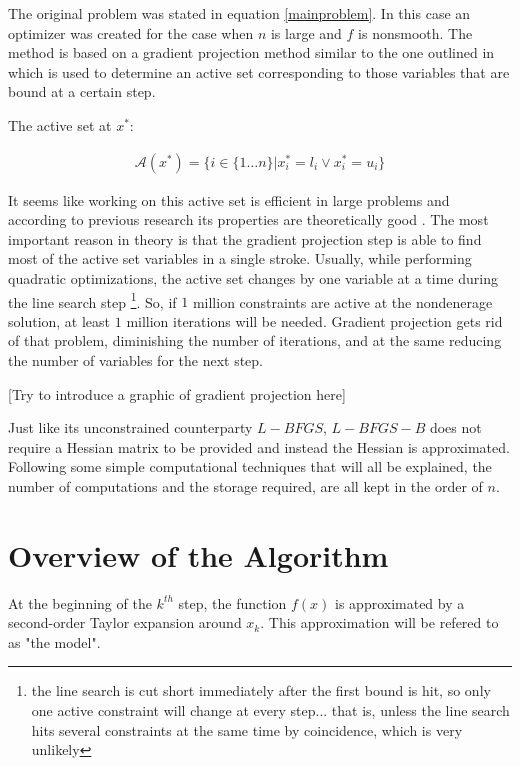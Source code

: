 The original problem was stated in equation \ref{mainproblem}.  In this case an optimizer was created for the case when $n$ is large and $f$ is nonsmooth.  The method is based on a gradient projection method similar to the one outlined in \citep{gradproj1, gradproj2} which is used to determine an active set corresponding to those variables that are bound at a certain step.  

The active set at $x^*$:

\begin{equation}
  \begin{aligned}
    \mathcal{A}(x^*) = \{ i \in \{1 \ldots n\} |  x^*_i = l_i \vee  x^*_i = u_i\}
  \end{aligned}
\end{equation}

It seems like working on this active set  is efficient in large problems and according to previous research its properties are theoretically good \citep{nocedal}.  The most important reason in theory is that the gradient projection step is able to find most of the active set variables in a single stroke.  Usually, while performing quadratic optimizations, the active set changes by one variable at a time during the line search step \footnote{the line search is cut short immediately after the first bound is hit, so only one active constraint will change at every step... that is, unless the line search hits several constraints at the same time by coincidence, which is very unlikely}.  So, if $1$ million constraints are active at the nondenerage solution, at least $1$ million iterations will be needed.   Gradient projection gets rid of that problem, diminishing the number of iterations, and at the same reducing the number of variables for the next step.

[Try to introduce a graphic of gradient projection here]

Just like its unconstrained counterparty $L-BFGS$, $L-BFGS-B$ does not require a Hessian matrix to be provided and instead the Hessian is approximated.  Following some simple computational techniques that will all be explained, the number of computations and the storage required, are all kept in the order of $n$.

\section{Overview of the Algorithm}

At the beginning of the $k^{th}$ step, the function $f(x)$ is approximated by a second-order Taylor expansion around $x_k$.  This approximation will be refered to as "the model".

